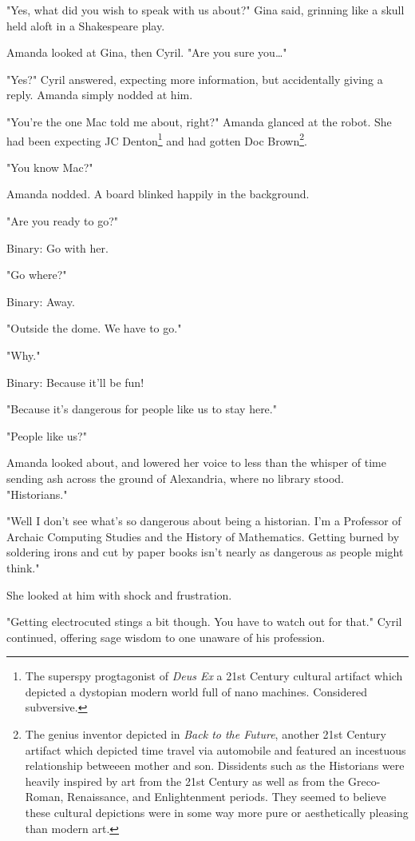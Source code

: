 \documentclass[12pt]{article}
\begin{document}
"Yes, what did you wish to speak with us about?" Gina said, grinning like a skull held aloft in a Shakespeare play.

Amanda looked at Gina, then Cyril. "Are you sure you\ldots{}"

"Yes?" Cyril answered, expecting more information, but accidentally giving a reply. Amanda simply nodded at him.

"You're the one Mac told me about, right?" Amanda glanced at the robot. She had been expecting JC Denton\footnote{The superspy progtagonist of \emph{Deus Ex} a 21st Century cultural artifact which depicted a dystopian modern world full of nano machines. Considered subversive.} and had gotten Doc Brown\footnote{The genius inventor depicted in \emph{Back to the Future}, another 21st Century artifact which depicted time travel via automobile and featured an incestuous relationship betweeen mother and son. Dissidents such as the Historians were heavily inspired by art from the 21st Century as well as from the Greco-Roman, Renaissance, and Enlightenment periods. They seemed to believe these cultural depictions were in some way more pure or aesthetically pleasing than modern art.}.

"You know Mac?"

Amanda nodded. A board blinked happily in the background.

"Are you ready to go?"

Binary: Go with her.

"Go where?"

Binary: Away.

"Outside the dome. We have to go."

"Why."

Binary: Because it'll be fun!

"Because it's dangerous for people like us to stay here."

"People like us?"

Amanda looked about, and lowered her voice to less than the whisper of time sending ash across the ground of Alexandria, where no library stood. "Historians."

"Well I don't see what's so dangerous about being a historian. I'm a Professor of Archaic Computing Studies and the History of Mathematics. Getting burned by soldering irons and cut by paper books isn't nearly as dangerous as people might think."

She looked at him with shock and frustration.

"Getting electrocuted stings a bit though. You have to watch out for that." Cyril continued, offering sage wisdom to one unaware of his profession.
\end{document}
